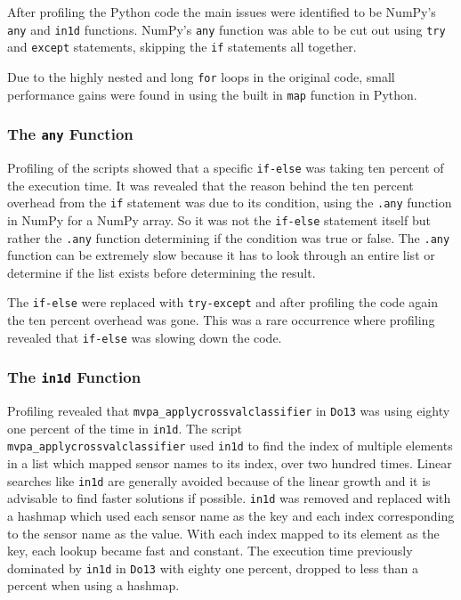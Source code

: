 \documentclass[12pt, a4paper]{article}
\begin{document}
After profiling the Python code the main issues were identified to be NumPy's \texttt{any} and \texttt{in1d} functions.
NumPy's \texttt{any} function was able to be cut out using \texttt{try} and \texttt{except} statements, skipping the \texttt{if} statements all together.%

Due to the highly nested and long \texttt{for} loops in the original code, small performance gains were found in using the built in \texttt{map} function in Python.

\subsubsection{The \texttt{any} Function}\label{metodAny}

Profiling of the scripts showed that a specific \texttt{if-else} was taking ten percent of the execution time.
It was revealed that the reason behind the ten percent overhead from the \texttt{if} statement was due to its condition, using the \texttt{.any} function in NumPy for a NumPy array.
So it was not the \texttt{if-else} statement itself but rather the \texttt{.any} function determining if the condition was true or false.
The \texttt{.any} function can be extremely slow because it has to look through an entire list or determine if the list exists before determining the result.

The \texttt{if-else} were replaced with \texttt{try-except} and after profiling the code again the ten percent overhead was gone.
This was a rare occurrence where profiling revealed that \texttt{if-else} was slowing down the code.

\subsubsection{The \texttt{in1d} Function}

Profiling revealed that \texttt{mvpa\_applycrossvalclassifier} in \texttt{Do13} was using eighty one percent of the time in \texttt{in1d}.
The script \\\texttt{mvpa\_applycrossvalclassifier} used \texttt{in1d} to find the index of multiple elements in a list which mapped sensor names to its index, over two hundred times.
Linear searches like \texttt{in1d} are generally avoided because of the linear growth and it is advisable to find faster solutions if possible.
\texttt{in1d} was removed and replaced with a hashmap which used each sensor name as the key and each index corresponding to the sensor name as the value.
With each index mapped to its element as the key, each lookup became fast and constant.
The execution time previously dominated by \texttt{in1d} in \texttt{Do13} with eighty one percent, dropped to less than a percent when using a hashmap.
\end{document}
